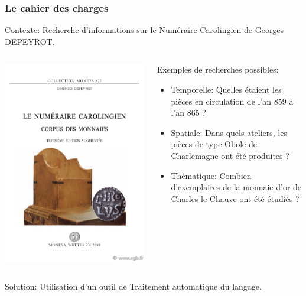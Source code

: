\documentclass[10pt, compress]{beamer}
\begin{document}
\begin{frame}[fragile]
	\frametitle{Le cahier des charges}
	Contexte: Recherche d'informations sur le Numéraire Carolingien de Georges DEPEYROT.
	\begin{columns}
			\includegraphics[scale=0.2]{img/depeyrot.jpg}
		\onslide<1>
		\begin{scriptsize}
			Exemples de recherches possibles:
			\begin{itemize}
				[square]
				\item{Temporelle: Quelles étaient les pièces en circulation de l’an 859 à l’an 865 ?}
				\item{Spatiale: Dans quels ateliers, les pièces de type Obole de Charlemagne ont été produites ?}
				\item{Thématique: Combien d’exemplaires de la monnaie d’or de Charles le Chauve ont été étudiés ?}
			\end{itemize}	
		\end{scriptsize}
	\end{columns}
	Solution: Utilisation d'un outil de Traitement automatique du langage.
\end{frame}
\end{document}
